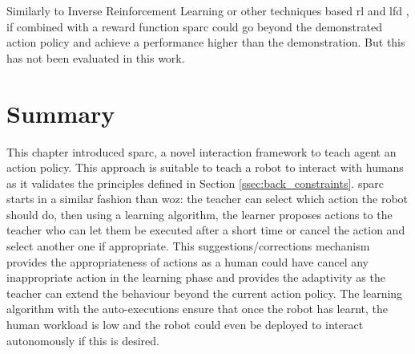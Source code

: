 Similarly to Inverse Reinforcement Learning \citep{abbeel2004apprenticeship} or other techniques based \gls{rl} and \gls{lfd} \citep{billard2008robot}, if combined with a reward function \gls{sparc} could go beyond the demonstrated action policy and achieve a performance higher than the demonstration. But this has not been evaluated in this work.

\section{Summary}
    
This chapter introduced \acrfull{sparc}, a novel interaction framework to teach agent an action policy. This approach is suitable to teach a robot to interact with humans as it validates the principles defined in Section \ref{ssec:back_constraints}. \gls{sparc} starts in a similar fashion than \gls{woz}: the teacher can select which action the robot should do, then using a learning algorithm, the learner proposes actions to the teacher who can let them be executed after a short time or cancel the action and select another one if appropriate. This suggestions/corrections mechanism provides the appropriateness of actions as a human could have cancel any inappropriate action in the learning phase and provides the adaptivity as the teacher can extend the behaviour beyond the current action policy. The learning algorithm with the auto-executions ensure that once the robot has learnt, the human workload is low and the robot could even be deployed to interact autonomously if this is desired.

